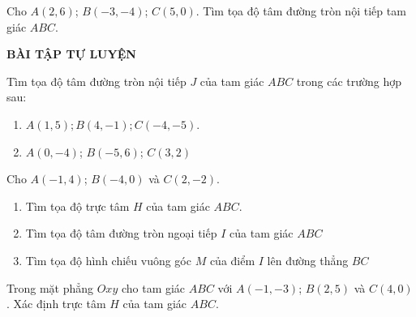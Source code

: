 \begin{vd}%
	Cho $A(2,6)$; $B(-3,-4)$; $C(5,0)$. Tìm tọa độ tâm đường tròn nội tiếp tam giác $ABC$.
\end{vd}
\begin{center}
	\textbf{BÀI TẬP TỰ LUYỆN}
\end{center}
\begin{bt}%
	Tìm tọa độ tâm đường tròn nội tiếp $J$ của tam giác $ABC$ trong các trường hợp sau:
	\begin{enumerate}
		\item $A(1,5); B(4,-1); C(-4,-5)$.
		\item $A(0,-4)$; $B(-5,6)$; $C(3,2)$   
	\end{enumerate}
\end{bt}


\begin{bt}%
	Cho $A(-1,4)$; $B(-4,0)$  và $C(2,-2)$.
	\begin{enumerate}
		\item Tìm tọa độ trực tâm $H$ của tam giác $ABC$.
		\item Tìm tọa độ tâm đường tròn ngoại tiếp $I$ của tam giác $ABC$
		\item Tìm tọa độ hình chiếu vuông góc $M$ của điểm $I$ lên đường thẳng $BC$
	\end{enumerate}
\end{bt}
\begin{bt}%
	Trong mặt phẳng $Oxy$ cho tam giác $ABC$ với $A(-1,-3)$; $B(2,5)$  và $C(4,0)$. Xác định trực tâm $H$ của tam giác $ABC$.
\end{bt}


